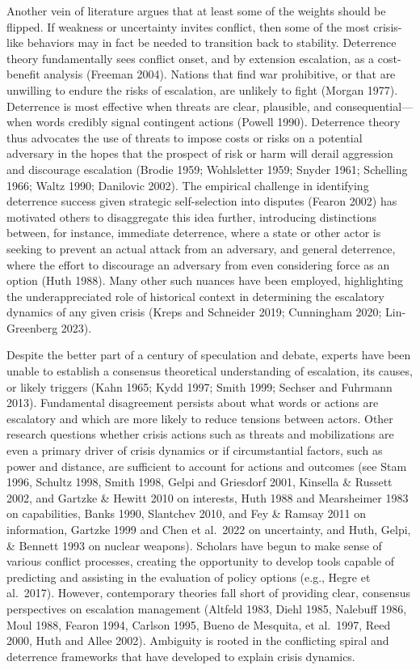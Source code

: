 \documentclass[
]{article}
\begin{document}
Another vein of literature argues that at least some of the weights
should be flipped. If weakness or uncertainty invites conflict, then
some of the most crisis-like behaviors may in fact be needed to
transition back to stability. Deterrence theory fundamentally sees
conflict onset, and by extension escalation, as a cost-benefit analysis
(Freeman 2004). Nations that find war prohibitive, or that are unwilling
to endure the risks of escalation, are unlikely to fight (Morgan 1977).
Deterrence is most effective when threats are clear, plausible, and
consequential---when words credibly signal contingent actions (Powell
1990). Deterrence theory thus advocates the use of threats to impose
costs or risks on a potential adversary in the hopes that the prospect
of risk or harm will derail aggression and discourage escalation (Brodie
1959; Wohlsletter 1959; Snyder 1961; Schelling 1966; Waltz 1990;
Danilovic 2002). The empirical challenge in identifying deterrence
success given strategic self-selection into disputes (Fearon 2002) has
motivated others to disaggregate this idea further, introducing
distinctions between, for instance, immediate deterrence, where a state
or other actor is seeking to prevent an actual attack from an adversary,
and general deterrence, where the effort to discourage an adversary from
even considering force as an option (Huth 1988). Many other such nuances
have been employed, highlighting the underappreciated role of historical
context in determining the escalatory dynamics of any given crisis
(Kreps and Schneider 2019; Cunningham 2020; Lin-Greenberg 2023).

Despite the better part of a century of speculation and debate, experts
have been unable to establish a consensus theoretical understanding of
escalation, its causes, or likely triggers (Kahn 1965; Kydd 1997; Smith
1999; Sechser and Fuhrmann 2013). Fundamental disagreement persists
about what words or actions are escalatory and which are more likely to
reduce tensions between actors. Other research questions whether crisis
actions such as threats and mobilizations are even a primary driver of
crisis dynamics or if circumstantial factors, such as power and
distance, are sufficient to account for actions and outcomes (see Stam
1996, Schultz 1998, Smith 1998, Gelpi and Griesdorf 2001, Kinsella \&
Russett 2002, and Gartzke \& Hewitt 2010 on interests, Huth 1988 and
Mearsheimer 1983 on capabilities, Banks 1990, Slantchev 2010, and Fey \&
Ramsay 2011 on information, Gartzke 1999 and Chen et al.~2022 on
uncertainty, and Huth, Gelpi, \& Bennett 1993 on nuclear weapons).
Scholars have begun to make sense of various conflict processes,
creating the opportunity to develop tools capable of predicting and
assisting in the evaluation of policy options (e.g., Hegre et al.~2017).
However, contemporary theories fall short of providing clear, consensus
perspectives on escalation management (Altfeld 1983, Diehl 1985,
Nalebuff 1986, Moul 1988, Fearon 1994, Carlson 1995, Bueno de Mesquita,
et al.~1997, Reed 2000, Huth and Allee 2002). Ambiguity is rooted in the
conflicting spiral and deterrence frameworks that have developed to
explain crisis dynamics.
\end{document}
